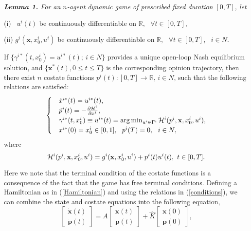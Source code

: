 \documentclass[10pt, conference, compsocconf]{IEEEtran}
\begin{document}
{\it \textbf{Lemma 1.} For an $n$-agent dynamic game of prescribed fixed duration $[0,T]$, let

(i) \ $u^i(t)$ be continuously differentiable on $\mathbb{R}$, \ $\forall t\in [0,T]$,

(ii) $g^i(\mathbf{x},x_0^i,u^i)$ be continuously differentiable on $\mathbb{R}$, \ $\forall t\in [0,T]$, \ $i\in N$.

If $\lbrace \gamma^{i*}(t,x_0^i) = u^{i*}(t); \ i\in N \rbrace$ provides a unique open-loop Nash equilibrium solution, and $\lbrace \mathbf{x}^{*}(t), 0\leq t \leq T \rbrace$ is the corresponding opinion trajectory, then there exist $n$ costate functions $p^i(t) : [0,T] \rightarrow \mathbb{R}$, $i\in N$, such that the following relations are satisfied:
\begin{equation} \label{conditions}
	\begin{cases}
		&\dot{x}^{i*}(t) = u^{i*}(t), \\
		&\dot{p}^i(t) = -\frac{\partial {\cal{H}}^i}{\partial x^i}, \\
		&\gamma^{i*}(t,x_0^i) \equiv u^{i*}(t) = \arg \min_{u^i\in \Gamma^i} {\cal{H}}^i(p^i,\mathbf{x},x_0^i,u^i), \\
		&x^{i*}(0) = x_0^i \in [0,1], \ \ p^i(T) = 0, \ \ i\in N, 
	\end{cases}
\end{equation}
where
\begin{equation} \label{Hamiltonian}
	{\cal{H}}^i (p^i,\mathbf{x},x_0^i,u^i) = g^i (\mathbf{x},x_0^i,u^i) + p^i(t) u^i(t), \ t\in [0,T]. 
\end{equation} }
Here we note that the terminal condition of the costate functions is a consequence of the fact that the game has free terminal conditions.
Defining a Hamiltonian as in (\ref{Hamiltonian}) and using the relations in (\ref{conditions}), we can combine the state and costate equations into the following equation,
\begin{equation} \label{eqn4}
	\left[ \begin{array}{c}
	\dot{\mathbf{x}}(t) \\ \dot{\mathbf{p}}(t)
	\end{array} \right] = A
	\left[ \begin{array}{c}
	\mathbf{x}(t) \\ \mathbf{p}(t)
	\end{array} \right] + \hat{K}
	\left[ \begin{array}{c}
	\mathbf{x}(0) \\ \mathbf{p}(0)
	\end{array} \right],
\end{equation}
\end{document}
